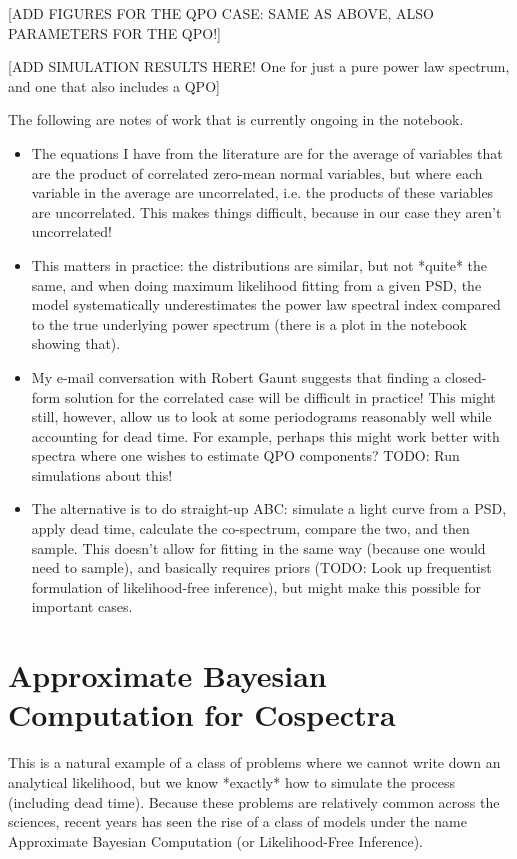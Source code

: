\documentclass[fleqn,usenatbib]{mnras}
\begin{document}
[ADD FIGURES FOR THE QPO CASE: SAME AS ABOVE, ALSO PARAMETERS FOR THE QPO!]



[ADD SIMULATION RESULTS HERE! One for just a pure power law spectrum, and one that also includes a QPO]

The following are notes of work that is currently ongoing in the notebook.

\begin{itemize}
\item{The equations I have from the literature are for the average of variables that are the product of correlated zero-mean normal variables, but where each variable in the average are uncorrelated, i.e. the products of these variables are uncorrelated. This makes things difficult, because in our case they aren't uncorrelated! }
\item{This matters in practice: the distributions are similar, but not *quite* the same, and when doing maximum likelihood fitting from a given PSD, the model systematically underestimates the power law spectral index compared to the true underlying power spectrum (there is a plot in the notebook showing that).}
\item{My e-mail conversation with Robert Gaunt suggests that finding a closed-form solution for the correlated case will be difficult in practice! This might still, however, allow us to look at some periodograms reasonably well while accounting for dead time. For example, perhaps this might work better with spectra where one wishes to estimate QPO components? TODO: Run simulations about this!}
\item{The alternative is to do straight-up ABC: simulate a light curve from a PSD, apply dead time, calculate the co-spectrum, compare the two, and then sample. This doesn't allow for fitting in the same way (because one would need to sample), and basically requires priors (TODO: Look up frequentist formulation of likelihood-free inference), but might make this possible for important cases.}
\end{itemize}

\section{Approximate Bayesian Computation for Cospectra}

This is a natural example of a class of problems where we cannot write down an analytical likelihood, but we know *exactly* how to simulate the process (including dead time). Because these problems are relatively common across the sciences, recent years has seen the rise of a class of models under the name Approximate Bayesian Computation (or Likelihood-Free Inference). 
\end{document}
